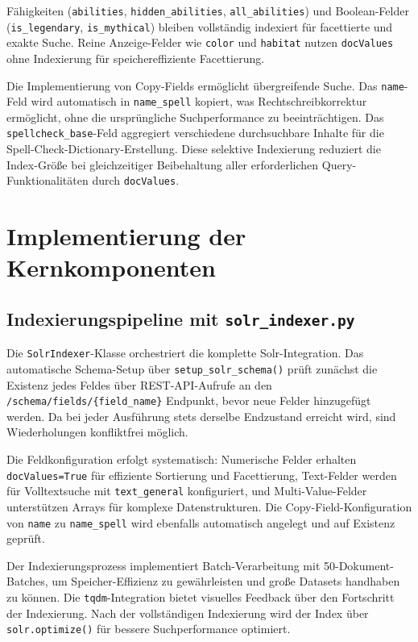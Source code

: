 Fähigkeiten (\texttt{abilities}, \texttt{hidden\_abilities}, \texttt{all\_abilities}) und Boolean-Felder (\texttt{is\_legendary}, \texttt{is\_mythical}) bleiben vollständig indexiert für facettierte und exakte Suche. Reine Anzeige-Felder wie \texttt{color} und \texttt{habitat} nutzen \texttt{docValues} ohne Indexierung für speichereffiziente Facettierung.

Die Implementierung von Copy-Fields ermöglicht übergreifende Suche. Das \texttt{name}-Feld wird automatisch in \texttt{name\_spell} kopiert, was Rechtschreibkorrektur ermöglicht, ohne die ursprüngliche Suchperformance zu beeinträchtigen. Das \texttt{spellcheck\_base}-Feld aggregiert verschiedene durchsuchbare Inhalte für die Spell-Check-Dictionary-Erstellung. Diese selektive Indexierung reduziert die Index-Größe bei gleichzeitiger Beibehaltung aller erforderlichen Query-Funktionalitäten durch \texttt{docValues}.

\section{Implementierung der Kernkomponenten}

\subsection{Indexierungspipeline mit \texttt{solr\_indexer.py}}

Die \texttt{SolrIndexer}-Klasse orchestriert die komplette Solr-Integration. Das automatische Schema-Setup über \texttt{setup\_solr\_schema()} prüft zunächst die Existenz jedes Feldes über REST-API-Aufrufe an den \texttt{/schema/fields/\{field\_name\}} Endpunkt, bevor neue Felder hinzugefügt werden. Da bei jeder Ausführung stets derselbe Endzustand erreicht wird, sind Wiederholungen konfliktfrei möglich.

Die Feldkonfiguration erfolgt systematisch: Numerische Felder erhalten \texttt{docValues=True} für effiziente Sortierung und Facettierung, Text-Felder werden für Volltextsuche mit \texttt{text\_general} konfiguriert, und Multi-Value-Felder unterstützen Arrays für komplexe Datenstrukturen. Die Copy-Field-Konfiguration von \texttt{name} zu \texttt{name\_spell} wird ebenfalls automatisch angelegt und auf Existenz geprüft.

Der Indexierungsprozess implementiert Batch-Verarbeitung mit 50-Dokument-Batches, um Speicher-Effizienz zu gewährleisten und große Datasets handhaben zu können. Die \texttt{tqdm}-Integration bietet visuelles Feedback über den Fortschritt der Indexierung. Nach der vollständigen Indexierung wird der Index über \texttt{solr.optimize()} für bessere Suchperformance optimiert.

